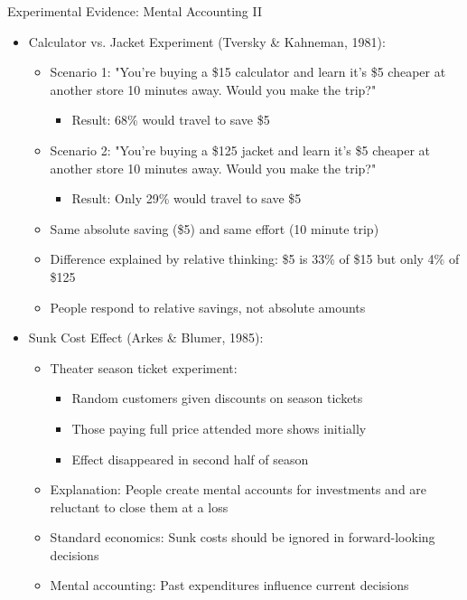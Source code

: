 \documentclass[10pt,handout]{beamer}
\begin{document}
\begin{frame}{Experimental Evidence: Mental Accounting II}
  \begin{itemize}[<+->]
    \item Calculator vs. Jacket Experiment (Tversky \& Kahneman, 1981):
      \begin{itemize}
        \item Scenario 1: "You're buying a \$15 calculator and learn it's \$5 cheaper at another store 10 minutes away. Would you make the trip?"
          \begin{itemize}
            \item Result: 68\% would travel to save \$5
          \end{itemize}
        \item Scenario 2: "You're buying a \$125 jacket and learn it's \$5 cheaper at another store 10 minutes away. Would you make the trip?"
          \begin{itemize}
            \item Result: Only 29\% would travel to save \$5
          \end{itemize}
        \item Same absolute saving (\$5) and same effort (10 minute trip)
        \item Difference explained by relative thinking: \$5 is 33\% of \$15 but only 4\% of \$125
        \item People respond to relative savings, not absolute amounts
      \end{itemize}
    \item Sunk Cost Effect (Arkes \& Blumer, 1985):
      \begin{itemize}
        \item Theater season ticket experiment:
          \begin{itemize}
            \item Random customers given discounts on season tickets
            \item Those paying full price attended more shows initially
            \item Effect disappeared in second half of season
          \end{itemize}
        \item Explanation: People create mental accounts for investments and are reluctant to close them at a loss
        \item Standard economics: Sunk costs should be ignored in forward-looking decisions
        \item Mental accounting: Past expenditures influence current decisions
      \end{itemize}
  \end{itemize}
\end{frame}
\end{document}
